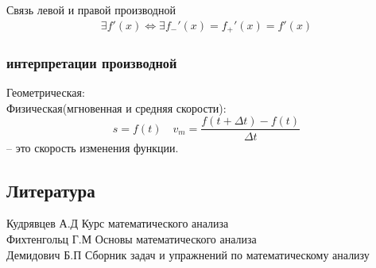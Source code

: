 \documentclass[a4paper, 12pt]{article}
\begin{document}
Связь левой и правой производной
\begin{align*}
  \exists f'(x) \Leftrightarrow \exists f_{-}'(x) = f_{+}'(x) = f'(x)
\end{align*}

\subsubsection{интерпретации производной}
Геометрическая:\\


Физическая(мгновенная и средняя скорости):\\
\[
  s = f(t) \quad v_m = \frac{f(t + \Delta t) - f(t)}{\Delta t}
\]
-- это скорость изменения функции.


\newpage
\subsection*{Литература}
Кудрявцев А.Д Курс математического анализа\\
Фихтенгольц Г.М Основы математического анализа\\
Демидович Б.П Сборник задач и упражнений по математическому анализу\\
\end{document}

